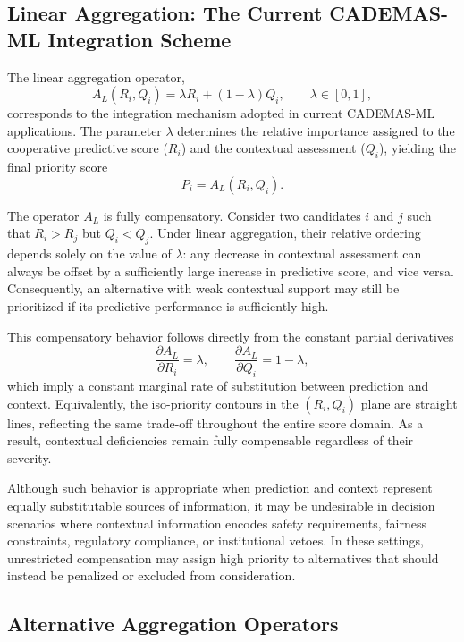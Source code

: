 \documentclass[mathematics,article,submit,moreauthors]{Definitions/mdpi}
\begin{document}
\subsection{Linear Aggregation: The Current CADEMAS-ML Integration Scheme}
\label{subsect:linear}

The linear aggregation operator,
\begin{equation}
A_L(R_i,Q_i)=\lambda R_i+(1-\lambda)Q_i,\qquad \lambda\in[0,1],
\end{equation}
corresponds to the integration mechanism adopted in current CADEMAS-ML applications. The parameter $\lambda$ determines the relative importance assigned to the cooperative predictive score ($R_i$) and the contextual assessment ($Q_i$), yielding the final priority score
\[
P_i=A_L(R_i,Q_i).
\]

The operator $A_L$ is fully compensatory. Consider two candidates $i$ and $j$ such that $R_i>R_j$ but $Q_i<Q_j$. Under linear aggregation, their relative ordering depends solely on the value of $\lambda$: any decrease in contextual assessment can always be offset by a sufficiently large increase in predictive score, and vice versa. Consequently, an alternative with weak contextual support may still be prioritized if its predictive performance is sufficiently high.

This compensatory behavior follows directly from the constant partial derivatives
\[
\frac{\partial A_L}{\partial R_i}=\lambda,\qquad
\frac{\partial A_L}{\partial Q_i}=1-\lambda,
\]
which imply a constant marginal rate of substitution between prediction and context. Equivalently, the iso-priority contours in the $(R_i,Q_i)$ plane are straight lines, reflecting the same trade-off throughout the entire score domain. As a result, contextual deficiencies remain fully compensable regardless of their severity.

Although such behavior is appropriate when prediction and context represent equally substitutable sources of information, it may be undesirable in decision scenarios where contextual information encodes safety requirements, fairness constraints, regulatory compliance, or institutional vetoes. In these settings, unrestricted compensation may assign high priority to alternatives that should instead be penalized or excluded from consideration.

\subsection{Alternative Aggregation Operators}
\label{subsect:alternative_operators}
\end{document}
